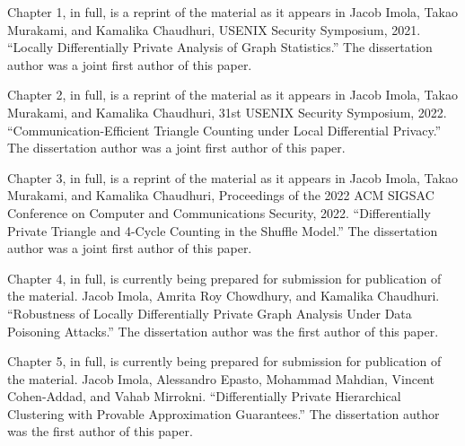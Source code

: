 \documentclass[12pt]{ucsddissertation}
\begin{document}
\begin{acknowledgements}
Chapter 1, in full, is a reprint of the material as it appears in Jacob Imola,
Takao Murakami, and Kamalika Chaudhuri, USENIX Security Symposium, 2021.
``Locally Differentially Private Analysis of Graph Statistics.''
The dissertation author was a joint first author of this paper.

Chapter 2, in full, is a reprint of the material as it appears in
Jacob Imola,
Takao Murakami, and Kamalika Chaudhuri, 31st USENIX Security Symposium, 2022.
``Communication-Efficient Triangle Counting under Local Differential Privacy.''
The dissertation author was a joint first author of this paper.

Chapter 3, in full, is a reprint of the material as it appears in Jacob Imola,
Takao Murakami, and Kamalika Chaudhuri, Proceedings of the 2022 ACM SIGSAC Conference on 
Computer and Communications Security, 2022. ``Differentially Private Triangle and 4-Cycle 
Counting in the Shuffle Model.'' The dissertation author was a joint first author of this paper.

Chapter 4, in full, is currently being prepared for submission for publication of the material.
Jacob Imola, Amrita Roy Chowdhury, and Kamalika Chaudhuri.
``Robustness of Locally Differentially Private Graph Analysis Under Data Poisoning Attacks.''
The dissertation author was the first author of this paper.

Chapter 5, in full, is currently being prepared for submission for publication of the material.
Jacob Imola, Alessandro Epasto, Mohammad Mahdian, Vincent Cohen-Addad, and Vahab Mirrokni.
``Differentially Private Hierarchical Clustering with Provable Approximation Guarantees.''
The dissertation author was the first author of this paper.

\end{acknowledgements}
\end{document}
